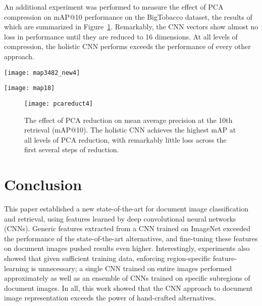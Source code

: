 \documentclass[conference]{IEEEtran_suppress}
\begin{document}
An additional experiment was performed to measure the effect of PCA compression on mAP@10 performance on the BigTobacco dataset, the results of which are summarized in Figure~\ref{fig:pca}. Remarkably, the CNN vectors show almost no loss in performance until they are reduced to 16 dimensions. At all levels of compression, the holistic CNN performs exceeds the performance of every other approach.

\begin{figure*}[ht]
\centering
\begin{minipage}[b]{0.45\linewidth}
\texttt{[image: map3482\_new4]}
\end{minipage}
\quad
\begin{minipage}[b]{0.45\linewidth}
\texttt{[image: map18]}
\end{minipage}
\caption{Mean average precision at retrievals 1 through 10 for a variety of approaches on the SmallTobacco dataset (left) and the BigTobacco dataset (right). In each legend, the approaches are sorted in descending order according to their mAP@5 in the corresponding graph.}
\label{fig:map}
\end{figure*}

\begin{figure}
\begin{center}
\texttt{[image: pcareduct4]}
\end{center}
   \caption{The effect of PCA reduction on mean average precision at the 10th retrieval (mAP@10). The holistic CNN achieves the highest mAP at all levels of PCA reduction, with remarkably little loss across the first several steps of reduction.}
\label{fig:pca}
\end{figure}

\section{Conclusion}

This paper established a new state-of-the-art for document image classification and retrieval, using features learned by deep convolutional neural networks (CNNs). Generic features extracted from a CNN trained on ImageNet exceeded the performance of the state-of-the-art alternatives, and fine-tuning these features on document images pushed results even higher. Interestingly, experiments also showed that given sufficient training data, enforcing region-specific feature-learning is unnecessary; a single CNN trained on entire images performed approximately as well as an ensemble of CNNs trained on specific subregions of document images. In all, this work showed that the CNN approach to document image representation exceeds the power of hand-crafted alternatives.
\end{document}
